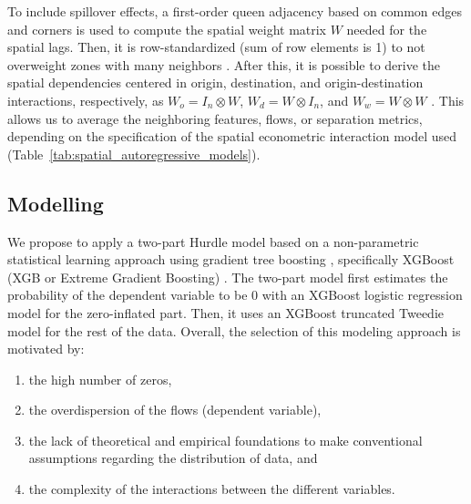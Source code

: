 To include spillover effects, a first-order queen adjacency based on common edges and corners is used to compute the spatial weight matrix $W$ needed for the spatial lags. Then, it is row-standardized (sum of row elements is 1) to not overweight zones with many neighbors \citep{Griffith2020SomeModels}.
After this, it is possible to derive the spatial dependencies centered in origin, destination, and origin-destination interactions, respectively, as $W_o = I_n \otimes W$,  $W_d = W \otimes I_n$, and $W_w = W \otimes W$ \citep{LeSage2008SpatialFlows}. This allows us to average the neighboring features, flows, or separation metrics, depending on the specification of the spatial econometric interaction model used (Table~\ref{tab:spatial_autoregressive_models}).

\subsection{Modelling}
\label{subsec:ETRCO2H_modelling}

We propose to apply a two-part Hurdle model \citep{Mullahy1986SpecificationModels} based on a non-parametric statistical learning approach using gradient tree boosting \citep{Friedman2001GreedyMachine.}, specifically XGBoost (XGB or Extreme Gradient Boosting) \citep{Chen2016XGBoost:System}. The two-part model first estimates the probability of the dependent variable to be 0 with an XGBoost logistic regression model for the zero-inflated part. Then, it uses an XGBoost truncated Tweedie model \citep{Valero2012ExtendedModel} for the rest of the data. Overall, the selection of this modeling approach is motivated by:
\begin{enumerate}
    \item the high number of zeros, 
    \item the overdispersion of the flows (dependent variable), 
    \item the lack of theoretical and empirical foundations to make conventional assumptions regarding the distribution of data, and 
    \item the complexity of the interactions between the different variables.
\end{enumerate}

